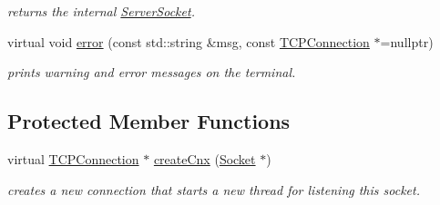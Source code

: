\begin{DoxyCompactItemize}
\begin{DoxyCompactList}\small\item\em returns the internal \hyperlink{classcppu_1_1_server_socket}{Server\+Socket}. \end{DoxyCompactList}\item 
\hypertarget{classcppu_1_1_t_c_p_server_afc47ca4476d9c75d5ea88f73e2acd6d5}{virtual void \hyperlink{classcppu_1_1_t_c_p_server_afc47ca4476d9c75d5ea88f73e2acd6d5}{error} (const std\+::string \&msg, const \hyperlink{classcppu_1_1_t_c_p_connection}{T\+C\+P\+Connection} $\ast$=nullptr)}\label{classcppu_1_1_t_c_p_server_afc47ca4476d9c75d5ea88f73e2acd6d5}

\begin{DoxyCompactList}\small\item\em prints warning and error messages on the terminal. \end{DoxyCompactList}\end{DoxyCompactItemize}
\subsection*{Protected Member Functions}
\begin{DoxyCompactItemize}
\item 
\hypertarget{classcppu_1_1_t_c_p_server_abe314b95a31c88b479c81ec9bf123c65}{virtual \hyperlink{classcppu_1_1_t_c_p_connection}{T\+C\+P\+Connection} $\ast$ \hyperlink{classcppu_1_1_t_c_p_server_abe314b95a31c88b479c81ec9bf123c65}{create\+Cnx} (\hyperlink{classcppu_1_1_socket}{Socket} $\ast$)}\label{classcppu_1_1_t_c_p_server_abe314b95a31c88b479c81ec9bf123c65}

\begin{DoxyCompactList}\small\item\em creates a new connection that starts a new thread for listening this socket. \end{DoxyCompactList}\end{DoxyCompactItemize}
